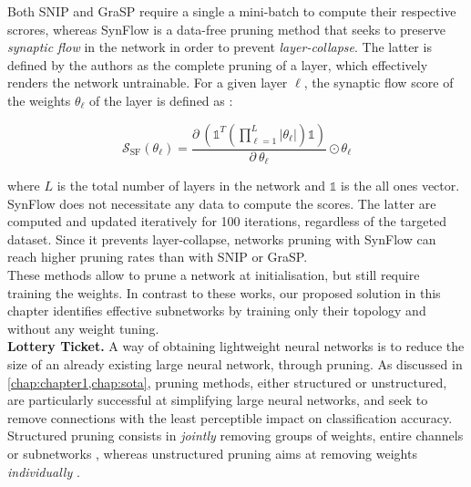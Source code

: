 Both SNIP and GraSP require a single a mini-batch to compute their respective
scrores, whereas SynFlow \cite{DBLP:conf/nips/TanakaKYG20} is a data-free
pruning method that seeks to preserve \emph{synaptic flow} in the network in
order to prevent \emph{layer-collapse}. The latter is defined by the authors as
the complete pruning of a layer, which effectively renders the network
untrainable. For a given layer $\ell$, the synaptic flow score of the weights
$\theta_\ell$ of the layer is defined as :

\begin{equation}
  \label{eqn:chap2:synflow_score}
  \mathcal{S}_\text{SF}(\theta_\ell) = \displaystyle\frac{\partial ~ \left(\mathbb{1}^T \left( \displaystyle\prod_{\ell=1}^{L} | \theta_\ell | \right) \mathbb{1}\right)}{\partial ~ \theta_\ell} \odot \theta_\ell
\end{equation}

\noindent where $L$ is the total number of layers in the network and
$\mathbb{1}$ is the all ones vector. SynFlow does not necessitate any data to
compute the scores. The latter are computed and updated iteratively for 100
iterations, regardless of the targeted dataset. Since it prevents layer-collapse,
networks pruning with SynFlow can reach higher pruning rates than with SNIP or
GraSP.\\

These methods allow to prune a network at initialisation, but still require
training the weights. In contrast to these works, our proposed solution in this
chapter identifies effective subnetworks by training only their topology and
without any weight tuning.\\

\noindent\textbf{Lottery Ticket.} A way of obtaining lightweight neural networks
is to reduce the size of an already existing large neural network, through
pruning. As discussed in \cref{chap:chapter1,chap:sota}, pruning methods, either
structured or unstructured, are particularly successful at simplifying large
neural networks, and seek to remove connections with the least perceptible
impact on classification accuracy. Structured pruning consists in {\it jointly}
removing groups of weights, entire channels or subnetworks
\cite{DBLP:conf/iclr/0022KDSG17, DBLP:conf/iccv/LiuLSHYZ17}, whereas
unstructured pruning aims at removing weights {\it individually}
\cite{DBLP:conf/nips/HanPTD15,DBLP:journals/corr/HanMD15}.\\

